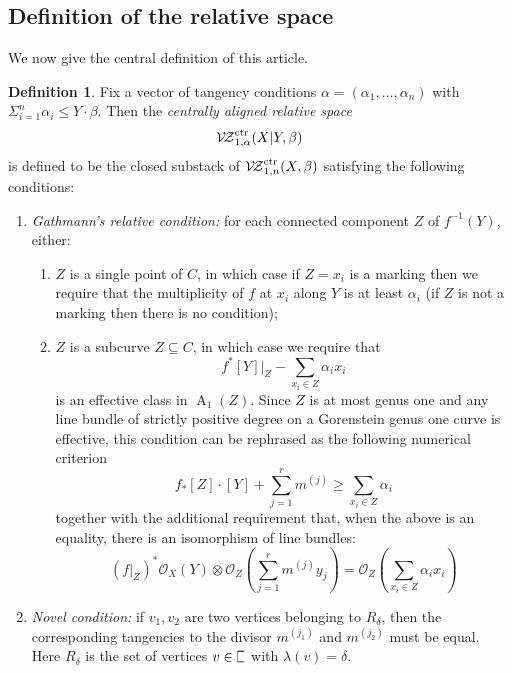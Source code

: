 \documentclass[11pt]{amsart}
\newcommand{\plC}{\scalebox{0.8}[1.3]{$\sqsubset$}}
\newcommand{\VZc}{{\mathcal{V\!Z}}^{\rm{ctr}}_{1,n}}
\newcommand{\VZcrel}{{\mathcal{V\!Z}}^{\rm{ctr}}_{1,\alpha}}
\newcommand{\OO}{\mathcal{O}}
\newcommand{\Achow}{\operatorname{A}}
\theoremstyle{definition}
\theoremstyle{definition}
\newtheorem{dfn}[thm]{Definition}
\begin{document}
\subsection{Definition of the relative space} We now give the central definition of this article.
\begin{dfn}
Fix a vector of tangency conditions $\alpha=(\alpha_1,\ldots,\alpha_n)$ with $\Sigma_{i=1}^n \alpha_i \leq Y \cdot \beta$. Then the \emph{centrally aligned relative space} 
\begin{equation*}\VZcrel(X|Y,\beta) \end{equation*}
is defined to be the closed substack of $\VZc(X,\beta)$ satisfying the following conditions:
\begin{enumerate}
\item \emph{Gathmann's relative condition:} for each connected component $Z$ of $f^{-1}(Y)$, either:
\begin{enumerate}
\item $Z$ is a single point of $C$, in which case if $Z=x_i$ is a marking then we require that the multiplicity of $f$ at $x_i$ along $Y$ is at least $\alpha_i$ (if $Z$ is not a marking then there is no condition);
\item $Z$ is a subcurve $Z \subseteq C$, in which case we require that
\begin{equation*} f^*[Y]|_Z -\sum_{x_i\in Z}\alpha_ix_i\end{equation*}
is an effective class in $\Achow_1(Z)$. Since $Z$ is at most genus one and any line bundle of strictly positive degree on a Gorenstein genus one curve is effective, this condition can be rephrased as the following numerical criterion
\begin{equation*} f_*[Z]\cdot [Y]+\sum_{j=1}^r m^{(j)}\geq \sum_{x_i\in Z}\alpha_i \end{equation*}
together with the additional requirement that, when the above is an equality, there is an isomorphism of line bundles:
\begin{equation*} (f|_{Z})^*\OO_X(Y) \otimes \OO_Z\left(\sum_{j=1}^r m^{(j)}y_j\right)=\OO_Z\left(\sum_{x_i\in Z}\alpha_ix_i\right)\end{equation*}
\end{enumerate}

\item \emph{Novel condition:} if $v_1,v_2$ are two vertices belonging to $R_\delta$, then the corresponding tangencies to the divisor $m^{(j_1)}$ and $m^{(j_2)}$ must be equal. Here $R_\delta$ is the set of vertices $v \in \plC$ with $\lambda(v)=\delta$.
\end{enumerate}
\end{dfn}
\end{document}
